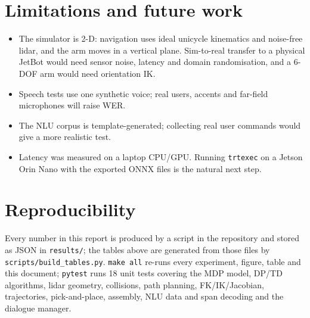 \documentclass[11pt,a4paper]{article}
\begin{document}
\section{Limitations and future work}
\begin{itemize}
\item The simulator is 2-D: navigation uses ideal unicycle kinematics and noise-free lidar, and the arm
moves in a vertical plane. Sim-to-real transfer to a physical JetBot would need sensor noise, latency and
domain randomisation, and a 6-DOF arm would need orientation IK.
\item Speech tests use one synthetic voice; real users, accents and far-field microphones will raise WER.
\item The NLU corpus is template-generated; collecting real user commands would give a more realistic test.
\item Latency was measured on a laptop CPU/GPU. Running \texttt{trtexec} on a Jetson Orin Nano with the
exported ONNX files is the natural next step.
\end{itemize}

\section{Reproducibility}
Every number in this report is produced by a script in the repository and stored as JSON in
\texttt{results/}; the tables above are generated from those files by \texttt{scripts/build\_tables.py}.
\texttt{make all} re-runs every experiment, figure, table and this document; \texttt{pytest} runs 18 unit tests
covering the MDP model, DP/TD algorithms, lidar geometry, collisions, path planning, FK/IK/Jacobian,
trajectories, pick-and-place, assembly, NLU data and span decoding and the dialogue manager.
\end{document}

